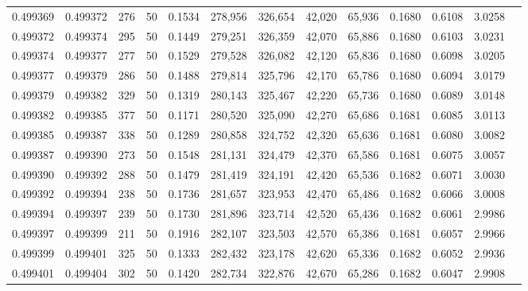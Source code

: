 \begin{tabular}{rrrrrrrrrrrrr}
0.499369 & 0.499372 & 276 &  50 &                                     0.1534 & 278,956 & 326,654 &  42,020 &  65,936 & 0.1680 & 0.6108 & 3.0258 \\
0.499372 & 0.499374 & 295 &  50 &                                     0.1449 & 279,251 & 326,359 &  42,070 &  65,886 & 0.1680 & 0.6103 & 3.0231 \\
0.499374 & 0.499377 & 277 &  50 &                                     0.1529 & 279,528 & 326,082 &  42,120 &  65,836 & 0.1680 & 0.6098 & 3.0205 \\
0.499377 & 0.499379 & 286 &  50 &                                     0.1488 & 279,814 & 325,796 &  42,170 &  65,786 & 0.1680 & 0.6094 & 3.0179 \\
0.499379 & 0.499382 & 329 &  50 &                                     0.1319 & 280,143 & 325,467 &  42,220 &  65,736 & 0.1680 & 0.6089 & 3.0148 \\
0.499382 & 0.499385 & 377 &  50 &                                     0.1171 & 280,520 & 325,090 &  42,270 &  65,686 & 0.1681 & 0.6085 & 3.0113 \\
0.499385 & 0.499387 & 338 &  50 &                                     0.1289 & 280,858 & 324,752 &  42,320 &  65,636 & 0.1681 & 0.6080 & 3.0082 \\
0.499387 & 0.499390 & 273 &  50 &                                     0.1548 & 281,131 & 324,479 &  42,370 &  65,586 & 0.1681 & 0.6075 & 3.0057 \\
0.499390 & 0.499392 & 288 &  50 &                                     0.1479 & 281,419 & 324,191 &  42,420 &  65,536 & 0.1682 & 0.6071 & 3.0030 \\
0.499392 & 0.499394 & 238 &  50 &                                     0.1736 & 281,657 & 323,953 &  42,470 &  65,486 & 0.1682 & 0.6066 & 3.0008 \\
0.499394 & 0.499397 & 239 &  50 &                                     0.1730 & 281,896 & 323,714 &  42,520 &  65,436 & 0.1682 & 0.6061 & 2.9986 \\
0.499397 & 0.499399 & 211 &  50 &                                     0.1916 & 282,107 & 323,503 &  42,570 &  65,386 & 0.1681 & 0.6057 & 2.9966 \\
0.499399 & 0.499401 & 325 &  50 &                                     0.1333 & 282,432 & 323,178 &  42,620 &  65,336 & 0.1682 & 0.6052 & 2.9936 \\
0.499401 & 0.499404 & 302 &  50 &                                     0.1420 & 282,734 & 322,876 &  42,670 &  65,286 & 0.1682 & 0.6047 & 2.9908 \\

\end{tabular}
